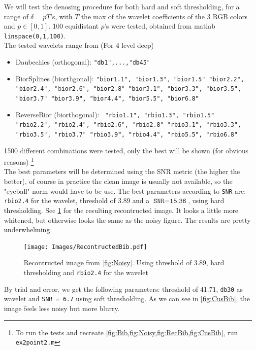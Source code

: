\documentclass[a4paper]{article}
\begin{document}
	We will test the denosing procedure for both hard and soft thresholding, for a range of $\delta = p T$'s, with $T$ the max of the wavelet coefficients of the 3 RGB colors and $p \in [0,1]$. 100 equidistant $p$'s were tested, obtained from matlab \texttt{linspace(0,1,100)}. \\
	The tested wavelets range from (For 4 level deep)
	\begin{itemize}
		\item Daubechies (orthogonal): \texttt{"db1",...,"db45"}
		\item BiorSplines (biorthgonal): \texttt{"bior1.1", "bior1.3", "bior1.5"
			"bior2.2", "bior2.4", "bior2.6", "bior2.8"
			"bior3.1", "bior3.3", "bior3.5", "bior3.7"
			"bior3.9", "bior4.4", "bior5.5", "bior6.8"}	
		\item ReverseBior (biorthogonal): \texttt{	"rbio1.1", "rbio1.3", "rbio1.5"
			"rbio2.2", "rbio2.4", "rbio2.6", "rbio2.8"	
			"rbio3.1", "rbio3.3", "rbio3.5", "rbio3.7"
			"rbio3.9", "rbio4.4", "rbio5.5", "rbio6.8"}
	\end{itemize}
	1500 different combinations were tested, only the best will be shown (for obvious reasons) \footnote{To run the tests and recreate \cref{fig:Bib,fig:Noisy,fig:RecBib,fig:CusBib}, run \texttt{ex2point2.m}} \\
	
	The best parameters will be determined using the SNR metric (the higher the better), of course in practice the clean image is usually not available, so the "eyeball" norm would have to be use. The best parameters according to \texttt{SNR} are: \texttt{rbio2.4} for the wavelet, threshold of 3.89 and a $\texttt{SNR} = \texttt{15.36}$, using hard thresholding. See \cref{fig:RecBib} for the resulting recontructed image. It looks a little more whitened, but otherwise looks the same as the noisy figure. The results are pretty underwhelming.

    \begin{figure}[H]
	\centering
	\texttt{[image: Images/RecontructedBib.pdf]}
	\caption{Recontructed image from \cref{fig:Noisy}. Using threshold of 3.89, hard thresholding and \texttt{rbio2.4} for the wavelet}
	\label{fig:RecBib}
\end{figure}
	
	By trial and error, we get the following parameters: threshold of 41.71, \texttt{db30} as wavelet and \texttt{SNR = 6.7} using soft thresholding. As we can see in \cref{fig:CusBib}, the image feels less noisy but more blurry.
	
\end{document}
